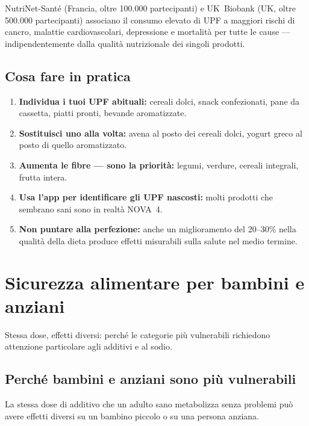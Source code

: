 \documentclass[a5paper,12pt,oneside,openany]{book}
\newcommand{\boxinfo}[2]{%
  \begin{tcolorbox}[boxbase,
    colback=blinfo!8!white, colframe=blinfo, title={#1}]
  #2\end{tcolorbox}}
\begin{document}
\boxinfo{I grandi studi epidemiologici}{NutriNet-Santé (Francia, oltre
100.000 partecipanti) e UK~Biobank (UK, oltre 500.000 partecipanti)
associano il consumo elevato di UPF a maggiori rischi di cancro, malattie
cardiovascolari, depressione e mortalità per tutte le cause ---
indipendentemente dalla qualità nutrizionale dei singoli prodotti.}

\section{Cosa fare in pratica}

\begin{enumerate}
  \item \textbf{Individua i tuoi UPF abituali:} cereali dolci, snack
    confezionati, pane da cassetta, piatti pronti, bevande aromatizzate.
  \item \textbf{Sostituisci uno alla volta:} avena al posto dei cereali
    dolci, yogurt greco al posto di quello aromatizzato.
  \item \textbf{Aumenta le fibre --- sono la priorità:} legumi, verdure,
    cereali integrali, frutta intera.
  \item \textbf{Usa l'app per identificare gli UPF nascosti:} molti
    prodotti che sembrano sani sono in realtà NOVA~4.
  \item \textbf{Non puntare alla perfezione:} anche un miglioramento
    del 20--30\% nella qualità della dieta produce effetti misurabili
    sulla salute nel medio termine.
\end{enumerate}

\chapter{Sicurezza alimentare per bambini e anziani}

Stessa dose, effetti diversi: perché le categorie più vulnerabili
richiedono attenzione particolare agli additivi e al sodio.

\section{Perché bambini e anziani sono più vulnerabili}

La stessa dose di additivo che un adulto sano metabolizza senza problemi
può avere effetti diversi su un bambino piccolo o su una persona anziana.
\end{document}
